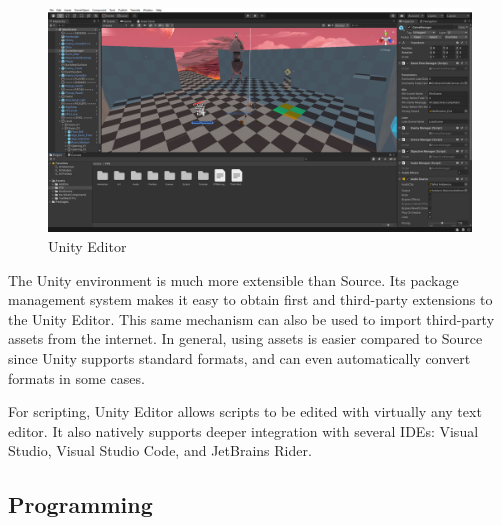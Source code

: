 \documentclass[a4paper, 12pt]{scrartcl}
\begin{document}
\begin{figure}[!ht]
  \centering
  \includegraphics[width=\linewidth]{images/unity_editor.png}
  \caption{Unity Editor}
\end{figure}

The Unity environment is much more extensible than Source. Its package management system makes it easy to obtain first and third-party extensions to the Unity Editor. This same mechanism can also be used to import third-party assets from the internet. In general, using assets is easier compared to Source since Unity supports standard formats, and can even automatically convert formats in some cases.

For scripting, Unity Editor allows scripts to be edited with virtually any text editor. It also natively supports deeper integration with several IDEs: Visual Studio, Visual Studio Code, and JetBrains Rider.

\subsection{Programming}
\end{document}
